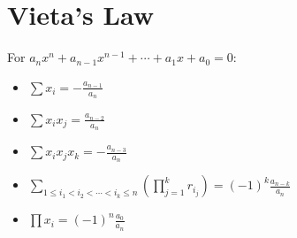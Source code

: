 \section{Vieta's Law}
For $a_{n}x^{n}+a_{n-1}x^{n-1}+\cdots +a_{1}x+a_{0}=0$:
\begin{itemize}
    \item $\sum x_i=-\frac{a_{n-1}}{a_n}$
    \item $\sum x_ix_j=\frac{a_{n-2}}{a_n}$
    \item $\sum x_ix_jx_k = -\frac{a_{n-3}}{a_n}$
    \item $\sum _{1\leq i_{1}<i_{2}<\cdots <i_{k}\leq n}\left(\prod _{j=1}^{k}r_{i_{j}}\right)=(-1)^{k}{\frac {a_{n-k}}{a_{n}}}$
    \item $\prod x_i=(-1)^n\frac{a_0}{a_n}$
\end{itemize}